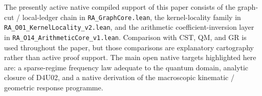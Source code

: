 \documentclass[11pt]{article}
\begin{document}
\begin{tcolorbox}[title=Scope of the active native support layer,colback=gray!5,colframe=gray!60]
The presently active native compiled support of this paper consists of the graph-cut / local-ledger chain in \texttt{RA\_GraphCore.lean}, the kernel-locality family in \texttt{RA\_O01\_KernelLocality\_v2.lean}, and the arithmetic coefficient-inversion layer in \texttt{RA\_O14\_ArithmeticCore\_v1.lean}. Comparison with CST, QM, and GR is used throughout the paper, but those comparisons are explanatory cartography rather than active proof support. The main open native targets highlighted here are: a sparse-regime frequency law adequate to the quantum domain, analytic closure of D4U02, and a native derivation of the macroscopic kinematic / geometric response programme.
\end{tcolorbox}
\end{document}
